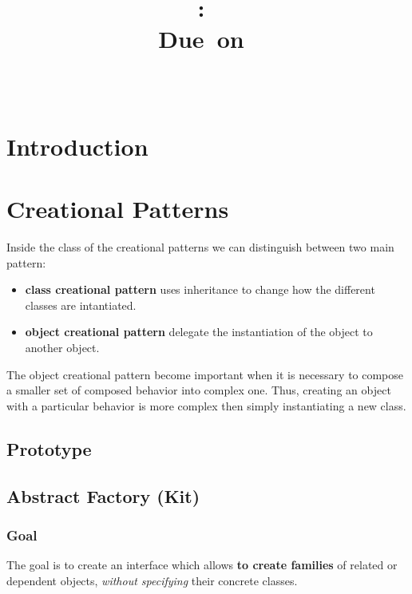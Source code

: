 \documentclass{article}
\title{
\vspace{2in}
\textmd{\textbf{\hmwkClass:\ \hmwkTitle}}\\
\normalsize\vspace{0.1in}\small{Due\ on\ \hmwkDueDate}\\
\vspace{0.1in}\large{\textit{\hmwkClassInstructor\ \hmwkClassTime}}
\vspace{3in}
}
\author{\textbf{\hmwkAuthorName}}
\date{} %
\begin{document}
\maketitle



\newpage
\tableofcontents
\newpage



\section{Introduction}


\section{Creational Patterns}
Inside the class of the creational patterns we can distinguish between two main pattern:
\begin{itemize}
\item \textbf{class creational pattern} uses inheritance to change how the different classes are intantiated.
\item \textbf{object creational pattern} delegate the instantiation of the object to another object.
\end{itemize}
The object creational pattern become important when it is necessary to compose a smaller set of composed behavior into complex one. Thus, creating an object with a particular behavior is more complex then simply instantiating a new class.

\subsection{Prototype}

\subsection{Abstract Factory (Kit)}
\subsubsection{Goal}
The goal is to create an interface which allows \textbf{to create families} of related or dependent objects, \textit{without specifying} their concrete classes. 
\end{document}
